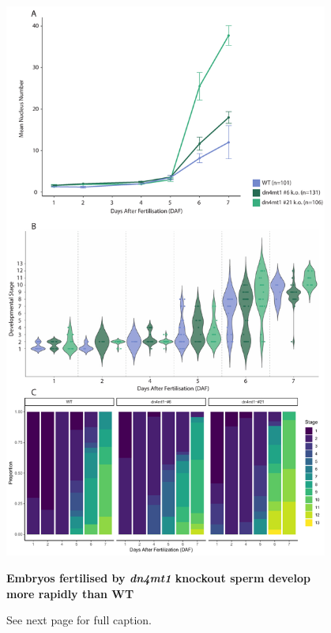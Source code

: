\begin{figure}[htbp!] 
\centering    
    \includegraphics[width=0.95\textwidth]{Chapter3/Figs/Figure11_nucleus_number.pdf}
    \captionsetup{belowskip=0pt, aboveskip=0pt}
    \caption{\textbf{Embryos fertilised by \textit{dn4mt1} knockout sperm develop more rapidly than WT}}
    \label{fig:nucleus_number}
    \caption*{See next page for full caption.}
\end{figure}

\clearpage 

\FloatBarrier  %

